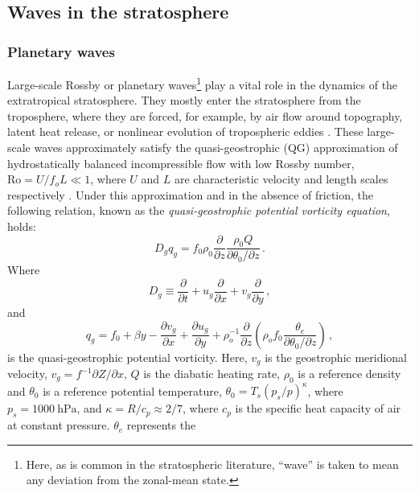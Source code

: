 \subsection{Waves in the stratosphere}
\label{sec:plan-waves-strat}

\subsubsection{Planetary waves}
\label{sec:planetary-waves}

Large-scale Rossby or planetary waves\footnote{Here, as is common in the
  stratospheric literature, ``wave'' is taken to mean any deviation from the
  zonal-mean state.} play a vital
role in the dynamics of the extratropical stratosphere. They mostly enter the
stratosphere from the troposphere, where they are forced, for example, by air
flow around topography, latent heat release, or nonlinear evolution of
tropospheric eddies \citep{Scinocca1998}. These large-scale waves approximately
satisfy the quasi-geostrophic (QG) approximation of hydrostatically balanced
incompressible flow with low Rossby number, $\mathrm{Ro} = U/f_oL \ll 1$, where
$U$ and $L$ are characteristic velocity and length scales respectively
\citep{Andrews1987}. Under this approximation and in the absence of friction,
the following relation, known as the \emph{quasi-geostrophic potential vorticity
  equation}, holds:
\begin{equation}
D_gq_g = f_0\rho_0 \frac{\partial}{\partial z}
\frac{\rho_0Q}{\partial\theta_{0}/\partial z} \, . 
\label{eq:qgpv}
\end{equation}
Where
\begin{equation}
D_g \equiv \frac{\partial}{\partial t} + u_g\frac{\partial}{\partial x} +
v_g\frac{\partial}{\partial y} \, , 
\end{equation}
and 
\begin{equation}
  q_g = f_0 + \beta y - \frac{\partial v_g}{\partial x} + \frac{\partial u_g}{\partial
    y} + \rho_o^{-1}\frac{\partial}{\partial
    z}\left(\rho_of_0\frac{\theta_e}{\partial\theta_{0}/\partial z}\right) \, , 
\end{equation}
is the quasi-geostrophic potential vorticity. Here, $v_g$ is the geostrophic
meridional velocity, $v_g = f^{-1}\partial Z/\partial x$, $Q$ is the diabatic
heating rate, $\rho_0$ is a reference density and $\theta_0$ is a reference
potential temperature, $\theta_0 = T_s(p_s/p)^\kappa$, where
$p_s=1000~\mathrm{hPa}$, and $\kappa = R/c_p \approx 2/7$, where $c_p$ is the
specific heat capacity of air at constant pressure. $\theta_e$ represents the
